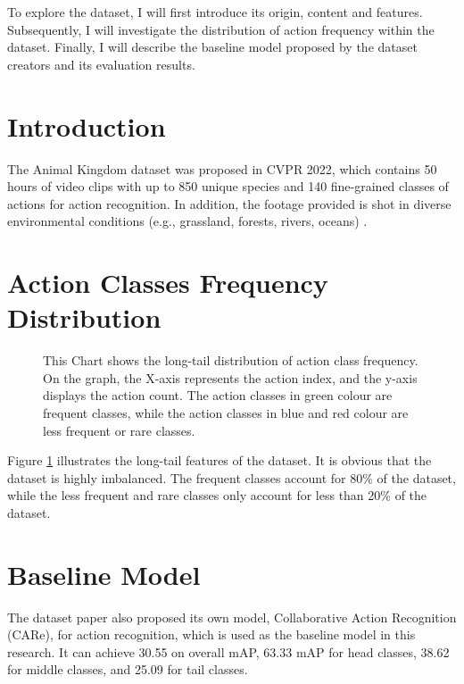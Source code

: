 To explore the dataset, I will first introduce its origin, content and features. Subsequently, I will investigate the distribution of action frequency within the dataset. Finally, I will describe the baseline model proposed by the dataset creators and its evaluation results.

\section{Introduction}
The Animal Kingdom dataset was proposed in CVPR 2022, which contains 50 hours of video clips with up to 850 unique species and 140 fine-grained classes of actions for action recognition. In addition, the footage provided is shot in diverse environmental conditions (e.g., grassland, forests, rivers, oceans) \parencite{ng2022animal}.

\section{Action Classes Frequency Distribution}

\begin{figure}[ht]
    \centering
    \resizebox{1.0\textwidth}{!}{}
    \caption[Action Classes Frequency Distribution]{This Chart shows the long-tail distribution of action class frequency. On the graph, the X-axis represents the action index, and the y-axis displays the action count. The action classes in green colour are frequent classes, while the action classes in blue and red colour are less frequent or rare classes.}
    \label{fig:classfreqdist}
\end{figure}

Figure \ref{fig:classfreqdist} illustrates the long-tail features of the dataset. It is obvious that the dataset is highly imbalanced. The frequent classes account for 80\% of the dataset, while the less frequent and rare classes only account for less than 20\% of the dataset.

\section{Baseline Model}
The dataset paper also proposed its own model, Collaborative Action Recognition (CARe), for action recognition, which is used as the baseline model in this research. It can achieve 30.55 on overall mAP, 63.33 mAP for head classes, 38.62 for middle classes, and 25.09 for tail classes. 
   
